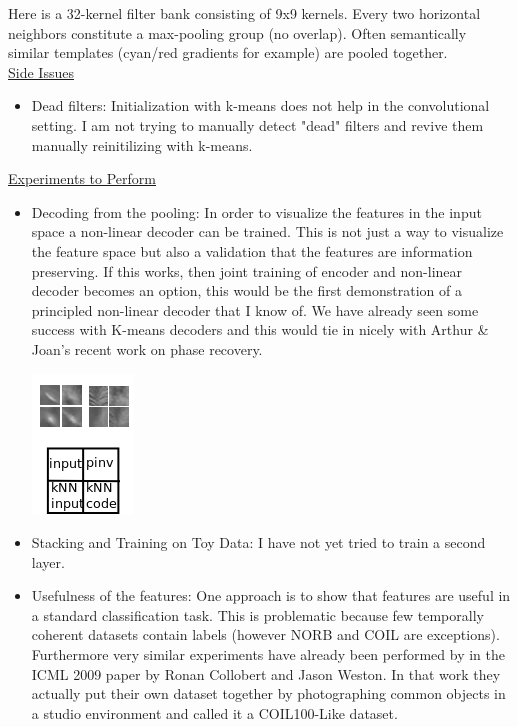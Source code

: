 \documentclass[12pt,a4paper]{report}
\begin{document}
Here is a 32-kernel filter bank consisting of 9x9 kernels. Every two horizontal neighbors constitute a max-pooling group (no overlap). Often semantically similar templates (cyan/red gradients for example) are pooled together.  \\
\noindent
\underline{Side Issues} 
\begin{itemize} 
\item Dead filters: Initialization with k-means does not help in the convolutional setting. I am not trying to manually detect "dead" filters and revive them manually reinitilizing with k-means. \\  
\end{itemize} 
\noindent
\underline{Experiments to Perform} 
\begin{itemize} 
\item Decoding from the pooling: In order to visualize the features in the input space a non-linear decoder can be trained. This is not just a way to visualize the feature space but also a validation that the features are information preserving. If this works, then joint training of encoder and non-linear decoder becomes an option, this would be the first demonstration of a principled non-linear decoder that I know of. We have already seen some success with K-means decoders and this would tie in nicely with Arthur \& Joan's recent work on phase recovery.  
\begin{center}
\includegraphics[scale=1.0]{example.png}
\end{center} 
\item Stacking and Training on Toy Data: I have not yet tried to train a second layer. 
\item Usefulness of the features: One approach is to show that features are useful in a standard classification task. This is problematic because few temporally coherent datasets contain labels (however NORB and COIL are exceptions). Furthermore very similar experiments have already been performed by in the ICML 2009 paper by Ronan Collobert and Jason Weston. In that work they actually put their own dataset together by photographing common objects in a studio environment and called it a COIL100-Like dataset. 
\end{itemize} 

  
\end{document}
